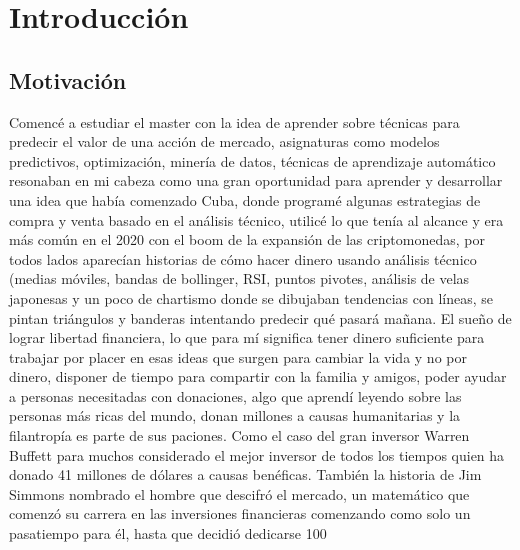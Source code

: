 \section{Introducción}
 
\subsection{Motivación}
Comencé a estudiar el master con la idea de aprender sobre técnicas para predecir el valor de una acción de mercado, asignaturas como modelos predictivos, optimización, minería de datos, técnicas de aprendizaje automático resonaban en mi cabeza como una gran oportunidad para aprender y desarrollar una idea que había comenzado Cuba, donde programé algunas estrategias de compra y venta basado en el análisis técnico, utilicé lo que tenía al alcance y era más común en el 2020 con el boom de la expansión de las criptomonedas, por todos lados aparecían historias de cómo hacer dinero usando análisis técnico (medias móviles, bandas de bollinger, RSI, puntos pivotes, análisis de velas japonesas y un poco de chartismo donde se dibujaban tendencias con líneas, se pintan triángulos y banderas intentando predecir qué pasará mañana. El sueño de lograr libertad financiera, lo que para mí significa tener dinero suficiente para trabajar por placer en esas ideas que surgen para cambiar la vida y no por dinero, disponer de tiempo para compartir con la familia y amigos, poder ayudar a personas necesitadas con donaciones, algo que aprendí leyendo sobre las personas más ricas del mundo, donan millones a causas humanitarias y la filantropía es parte de sus paciones. Como el caso del gran inversor Warren Buffett para muchos considerado el mejor inversor de todos los tiempos quien ha donado 41 millones de dólares a causas benéficas. También la historia de Jim Simmons nombrado el hombre que descifró el mercado, un matemático que comenzó su carrera en las inversiones financieras comenzando como solo un pasatiempo para él, hasta que decidió dedicarse 100%